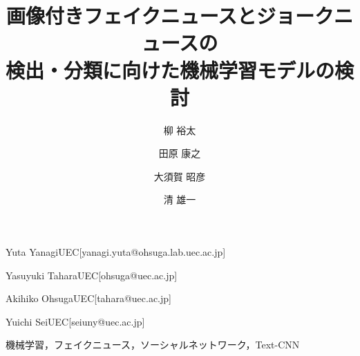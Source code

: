 \documentclass[submit]{ipsj}
\begin{document}
\title{画像付きフェイクニュースとジョークニュースの\\検出・分類に向けた機械学習モデルの検討}



\author{柳 裕太}{Yuta Yanagi}{UEC}[yanagi.yuta@ohsuga.lab.uec.ac.jp]
\author{田原 康之}{Yasuyuki Tahara}{UEC}[ohsuga@uec.ac.jp]
\author{大須賀 昭彦}{Akihiko Ohsuga}{UEC}[tahara@uec.ac.jp]
\author{清 雄一}{Yuichi Sei}{UEC}[seiuny@uec.ac.jp]



\begin{jkeyword}
機械学習，フェイクニュース，ソーシャルネットワーク，Text-CNN
\end{jkeyword}

\maketitle












\end{document}

